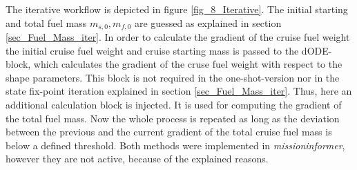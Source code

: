 The iterative workflow is depicted 
in figure \ref{fig_8_Iterative}.
The initial starting and total fuel mass 
$m_{s,0}, m_{f,0}$ are guessed as explained 
in section \ref{sec_Fuel_Mass_iter}. In 
order to calculate the gradient 
of the cruise fuel weight the 
initial cruise fuel weight and cruise
starting mass is passed to the dODE-block, which 
calculates the gradient of the cruse fuel 
weight with respect to the shape parameters. 
This block is not required in the 
one-shot-version nor in the state 
fix-point iteration explained in section 
\ref{sec_Fuel_Mass_iter}. Thus, 
here an additional calculation block is injected.
It is used for computing 
the gradient of the total fuel mass. 
Now the whole process is repeated 
as long as the deviation between the 
previous and the current 
gradient of the total cruise 
fuel mass is below 
a defined threshold. Both methods were 
implemented in \emph{missioninformer}, 
however they are not active, because of 
the explained reasons. 



\begin{sidewaysfigure} [!h]
    \resizebox{1.\textwidth}{!}{
        \hspace*{-5cm} 
    
    }
    \caption{Analytical attempt to calculate gradients - one-shot version}
    \label{fig_7_Oneshot}
\end{sidewaysfigure}

\begin{sidewaysfigure} [!h]
    \resizebox{1\textwidth}{!}{
        \hspace*{-5cm} 
    
    }
    \caption{Analytical attempt to calculate gradients - iterative version}
    \label{fig_8_Iterative}
\end{sidewaysfigure}


